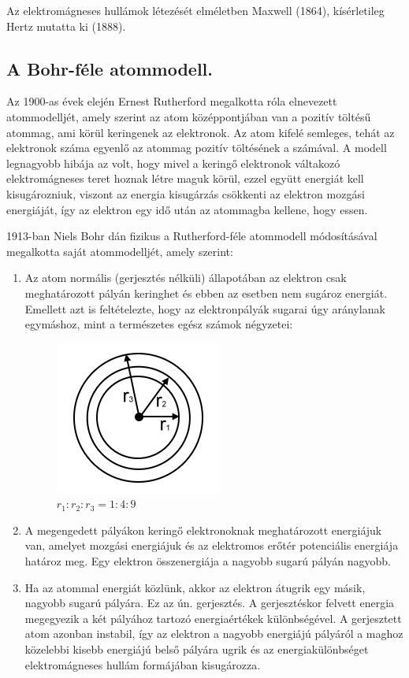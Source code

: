 Az elektromágneses hullámok létezését elméletben Maxwell (1864), kísérletileg Hertz mutatta ki (1888).

\subsection{A Bohr-féle atommodell.}
Az 1900-as évek elején Ernest Rutherford megalkotta róla elnevezett atommodelljét, amely szerint az atom középpontjában van a pozitív töltésű atommag, ami körül keringenek az elektronok. Az atom kifelé semleges, tehát az elektronok száma egyenlő az atommag pozitív töltésének a számával. A modell legnagyobb hibája az volt, hogy mivel a keringő elektronok váltakozó elektromágneses teret hoznak létre maguk körül, ezzel együtt energiát kell kisugározniuk, viszont az energia kisugárzás csökkenti az elektron mozgási energiáját, így az elektron egy idő után az atommagba kellene, hogy essen.

1913-ban Niels Bohr dán fizikus a Rutherford-féle atommodell módosításával megalkotta saját atommodelljét, amely szerint:
\begin{enumerate}[nosep]
	\item Az atom normális (gerjesztés nélküli) állapotában az elektron csak meghatározott pályán keringhet és 	ebben az esetben nem sugároz energiát. Emellett azt is feltételezte, hogy az elektronpályák sugarai úgy aránylanak egymáshoz, mint a természetes egész számok négyzetei:
	\begin{figure}[h]
		\centering
		\includegraphics[width=0.25\linewidth]{fig/9-Atom_eletrontracks}
		\caption{$r_1 : r_2 : r_3 = 1 : 4 : 9$}
		\label{fig:9-atomeletrontracks}
	\end{figure}
	
	\item A megengedett pályákon keringő elektronoknak meghatározott energiájuk van, amelyet mozgási energiájuk és az elektromos erőtér potenciális energiája határoz meg. Egy elektron összenergiája a nagyobb sugarú pályán nagyobb.
	\item Ha az atommal energiát közlünk, akkor az elektron átugrik egy másik, nagyobb sugarú pályára. Ez az ún. gerjesztés. A gerjesztéskor felvett energia megegyezik a két pályához tartozó energiaértékek különbségével. A gerjesztett atom azonban instabil, így az elektron a nagyobb energiájú pályáról a maghoz közelebbi kisebb energiájú belső pályára ugrik és az energiakülönbséget elektromágneses hullám formájában kisugározza.
\end{enumerate}

